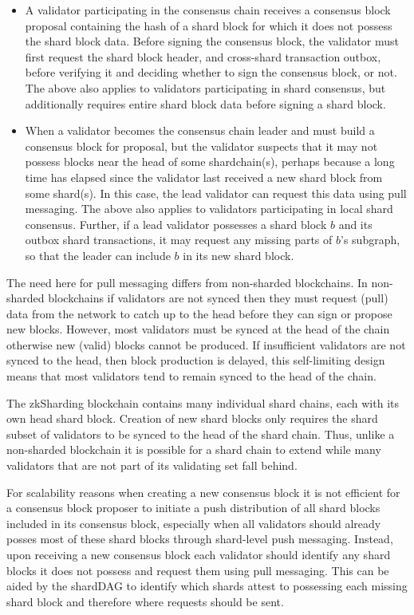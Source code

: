 \begin{itemize}
	\item A validator participating in the consensus chain receives a consensus block proposal containing the hash of a shard block for which it does not possess the shard block data. 
	Before signing the consensus block, the validator must first request the shard block header, and cross-shard transaction outbox, before verifying it and deciding whether to sign the consensus block, or not.
	The above also applies to validators participating in shard consensus, but additionally requires entire shard block data before signing a shard block.
	\item When a validator becomes the consensus chain leader and must build a consensus block for proposal, but the validator suspects that it may not possess blocks near the head of some shardchain(s), perhaps because a long time has elapsed since the validator last received a new shard block from some shard(s). 
	In this case, the lead validator can request this data using pull messaging.
	The above also applies to validators participating in local shard consensus. 
	Further, if a lead validator possesses a shard block $b$ and its outbox shard transactions, it may request any missing parts of $b$’s subgraph, so that the leader can include $b$ in its new shard block.
\end{itemize}

The need here for pull messaging differs from non-sharded blockchains. 
In non-sharded blockchains if validators are not synced then they must request (pull) data from the network to catch up to the head before they can sign or propose new blocks. 
However, most validators must be synced at the head of the chain otherwise new (valid) blocks cannot be produced. 
If insufficient validators are not synced to the head, then block production is delayed, this self-limiting design means that most validators tend to remain synced to the head of the chain.

The zkSharding blockchain contains many individual shard chains, each with its own head shard block. 
Creation of new shard blocks only requires the shard subset of validators to be synced to the head of the shard chain. 
Thus, unlike a non-sharded blockchain it is possible for a shard chain to extend while many validators that are not part of its validating set fall behind.

For scalability reasons when creating a new consensus block it is not efficient for a consensus block proposer to initiate a push distribution of all shard blocks included in its consensus block, especially when all validators should already posses most of these shard blocks through shard-level push messaging.
Instead, upon receiving a new consensus block each validator should identify any shard blocks it does not possess and request them using pull messaging. 
This can be aided by the shardDAG to identify which shards attest to possessing each missing shard block and therefore where requests should be sent.

